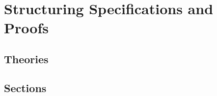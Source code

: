 \chapter{Structuring Specifications and Proofs}
\label{Structuring}

\section{Theories}

\section{Sections}
